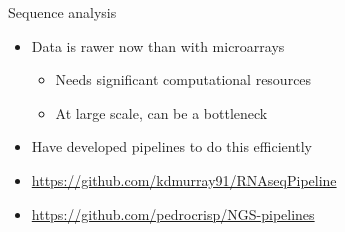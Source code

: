 \documentclass[t]{beamer}
\begin{document}
\begin{frame}{Sequence analysis}
  \begin{itemize}
    \item Data is rawer now than with microarrays
    \begin{itemize}
      \item Needs significant computational resources
      \item At large scale, can be a bottleneck
    \end{itemize}
    \pause
    \item Have developed pipelines to do this efficiently
    \item \url{https://github.com/kdmurray91/RNAseqPipeline}
    \item \url{https://github.com/pedrocrisp/NGS-pipelines}
  \end{itemize}
\end{frame}
\end{document}
